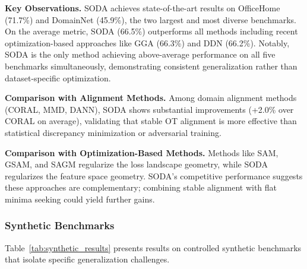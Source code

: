 \documentclass[preprint,12pt]{elsarticle}
\begin{document}
\textbf{Key Observations.} SODA achieves state-of-the-art results on OfficeHome (71.7\%) and DomainNet (45.9\%), the two largest and most diverse benchmarks. On the average metric, SODA (66.5\%) outperforms all methods including recent optimization-based approaches like GGA (66.3\%) and DDN (66.2\%). Notably, SODA is the only method achieving above-average performance on all five benchmarks simultaneously, demonstrating consistent generalization rather than dataset-specific optimization.

\textbf{Comparison with Alignment Methods.} Among domain alignment methods (CORAL, MMD, DANN), SODA shows substantial improvements (+2.0\% over CORAL on average), validating that stable OT alignment is more effective than statistical discrepancy minimization or adversarial training.

\textbf{Comparison with Optimization-Based Methods.} Methods like SAM, GSAM, and SAGM regularize the loss landscape geometry, while SODA regularizes the feature space geometry. SODA's competitive performance suggests these approaches are complementary; combining stable alignment with flat minima seeking could yield further gains.

\subsubsection{Synthetic Benchmarks}

Table~\ref{tab:synthetic_results} presents results on controlled synthetic benchmarks that isolate specific generalization challenges.
\end{document}
